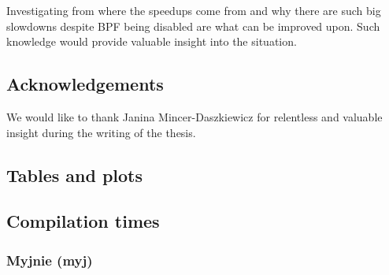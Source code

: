 \documentclass[en]{pracamgr}
\begin{document}
Investigating from where the speedups come from and why there are such big slowdowns despite BPF being disabled are what can be improved upon. Such knowledge would provide valuable insight into the situation.

\section{Acknowledgements}

We would like to thank Janina Mincer-Daszkiewicz for relentless and valuable insight during the writing of the thesis.

\printbibliography


\begin{appendices}

\chapter{Tables and plots}

\section{Compilation times}

\subsection{Myjnie (myj)}


\end{appendices}
\end{document}
